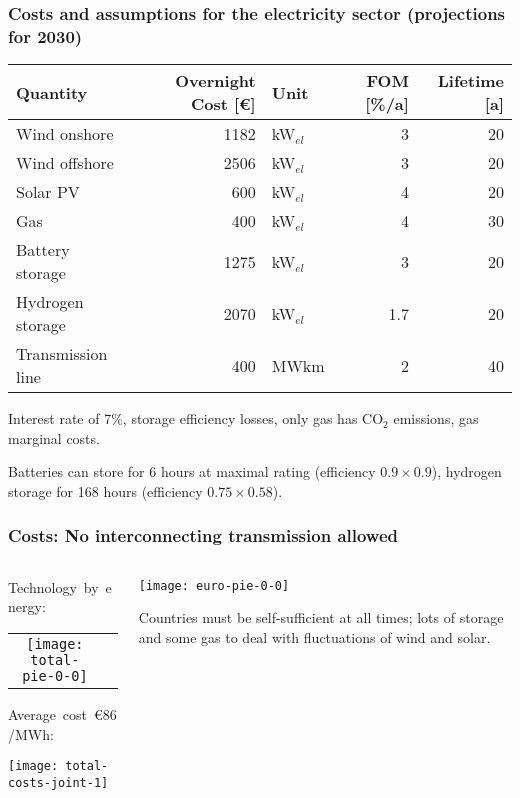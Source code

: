 \documentclass[10pt,aspectratio=169,dvipsnames]{beamer}
\def\co2{CO${}_2$}
\def\el{${}_{el}$}
\begin{document}
\begin{frame}
  \frametitle{Costs and assumptions for the electricity sector (projections for 2030)}

  \begin{table}
\centering
\begin{tabular}{@{}lrlrr@{}}
\toprule
Quantity                &Overnight  Cost [\euro]  &Unit & FOM [\%/a] & Lifetime [a] \\
\midrule
Wind onshore    &1182   &kW\el &3 & 20   \\
Wind offshore  &2506   &kW\el  &3& 20  \\
Solar PV           &600   &kW\el &4 & 20   \\
Gas             &400    &kW\el  &4& 30  \\
Battery storage         &1275   &kW\el  & 3 & 20 \\
Hydrogen storage        &2070   &kW\el  & 1.7 &20 \\
Transmission line       &400    &MWkm & 2 & 40\\
\bottomrule
\end{tabular}
\end{table}
  Interest rate of 7\%, storage efficiency losses, only gas has \co2 emissions, gas marginal costs.

  Batteries can store for 6 hours at maximal rating (efficiency $0.9\times 0.9$), hydrogen storage for 168 hours (efficiency $0.75\times 0.58$).
\end{frame}





\begin{frame}
  \frametitle{Costs: No interconnecting transmission allowed}



\begin{columns}[T]
  \begin{column}{4.9cm}

  Technology~by~energy:
  \begin{tabular}{cc}
    \texttt{[image: total-pie-0-0]} &
  \end{tabular}


  Average~cost~\alert{\euro 86/MWh}:

  \texttt{[image: total-costs-joint-1]}

  \end{column}

  \begin{column}{9cm}
    \centering
    \texttt{[image: euro-pie-0-0]}

    \raggedright
    Countries must be self-sufficient at all times; lots of storage and some gas to deal with fluctuations of wind and solar.
  \end{column}

\end{columns}
\end{frame}
\end{document}
